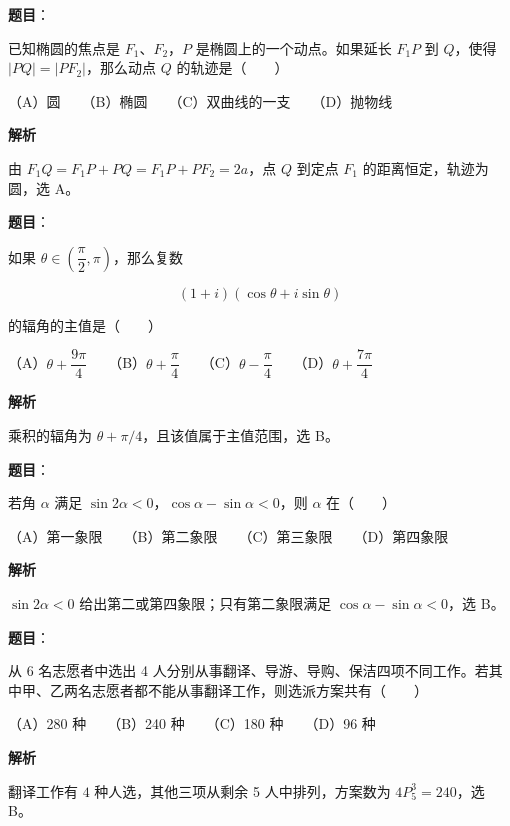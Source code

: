 \begin{answer}

\textbf{题目}：

已知椭圆的焦点是 $F_1\text{、}F_2$，$P$ 是椭圆上的一个动点。如果延长 $F_1P$ 到 $Q$，使得 $|PQ|=|PF_2|$，那么动点 $Q$ 的轨迹是\mbox{（　　）}

（A）圆　　（B）椭圆　　（C）双曲线的一支　　（D）抛物线

\textbf{解析}

由 $F_1Q=F_1P+PQ=F_1P+PF_2=2a$，点 $Q$ 到定点 $F_1$ 的距离恒定，轨迹为圆，选 A。


\end{answer}
\begin{answer}

\textbf{题目}：

如果 $\theta\in\left(\dfrac\pi2,\pi\right)$，那么复数

\nopagebreak[4]
\[
(1+i)(\cos\theta+i\sin\theta)
\]

的辐角的主值是\mbox{（　　）}

（A）$\theta+\dfrac{9\pi}{4}$　　（B）$\theta+\dfrac\pi4$　　（C）$\theta-\dfrac\pi4$　　（D）$\theta+\dfrac{7\pi}{4}$

\textbf{解析}

乘积的辐角为 $\theta+\pi/4$，且该值属于主值范围，选 B。


\end{answer}
\begin{answer}

\textbf{题目}：

若角 $\alpha$ 满足 $\sin2\alpha<0$，$\cos\alpha-\sin\alpha<0$，则 $\alpha$ 在\mbox{（　　）}

（A）第一象限　　（B）第二象限　　（C）第三象限　　（D）第四象限

\textbf{解析}

$\sin2\alpha<0$ 给出第二或第四象限；只有第二象限满足 $\cos\alpha-\sin\alpha<0$，选 B。


\end{answer}
\begin{answer}

\textbf{题目}：

从 6 名志愿者中选出 4 人分别从事翻译、导游、导购、保洁四项不同工作。若其中甲、乙两名志愿者都不能从事翻译工作，则选派方案共有\mbox{（　　）}

（A）280 种　　（B）240 种　　（C）180 种　　（D）96 种

\textbf{解析}

翻译工作有 $4$ 种人选，其他三项从剩余 5 人中排列，方案数为 $4P_5^3=240$，选 B。


\end{answer}
